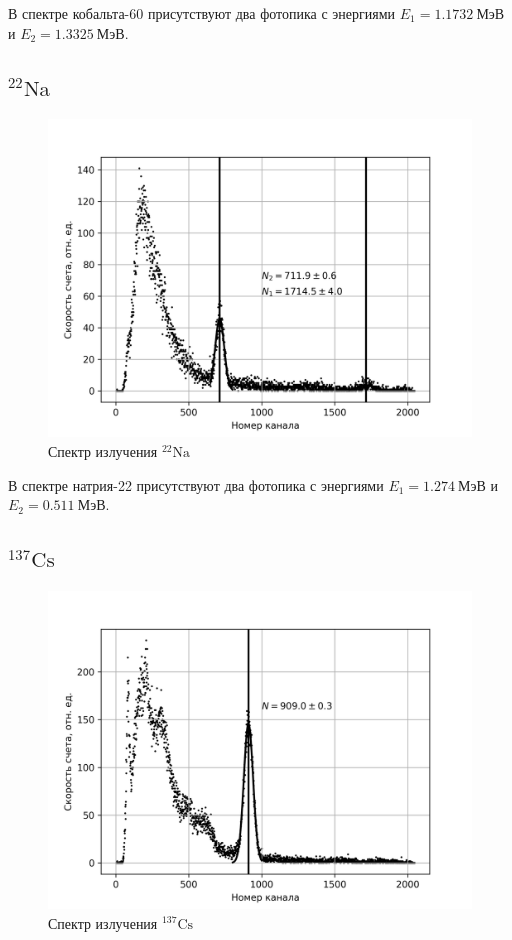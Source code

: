 \documentclass[14pt, a4paper]{report}
\begin{document}
В спектре кобальта-60 присутствуют два фотопика с энергиями $E_1=1.1732\ \text{МэВ}$ и $E_2=1.3325\ \text{МэВ}$.

\subsection{$^{22}\text{Na}$}

\begin{figure}[H]
\centering
\includegraphics[width=.7\textwidth]{../images/555-na22}
\caption{Спектр излучения $^{22}\text{Na}$}
\end{figure}

В спектре натрия-22 присутствуют два фотопика с энергиями $E_1=1.274\ \text{МэВ}$ и $E_2=0.511\ \text{МэВ}$.

\subsection{$^{137}\text{Cs}$}

\begin{figure}[H]
\centering
\includegraphics[width=.7\textwidth]{../images/555-cs137}
\caption{Спектр излучения $^{137}\text{Cs}$}
\end{figure}
\end{document}
